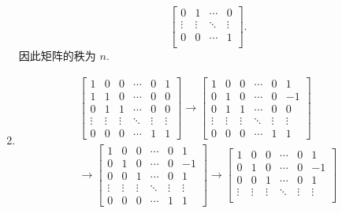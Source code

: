 \documentclass[a4paper, 11pt]{ctexart}
\begin{document}
\begin{enumerate}
\[\begin{bmatrix}
                0 & 1 & \cdots & 0 \\
                \vdots & \vdots & \ddots & \vdots \\
                0 & 0 & \cdots & 1 \\
            \end{bmatrix}.    
        \]
        因此矩阵的秩为 $n$.
    \item %
        \begin{gather*}
            \begin{bmatrix}
                1 & 0 & 0 & \cdots & 0 & 1 \\
                1 & 1 & 0 & \cdots & 0 & 0 \\
                0 & 1 & 1 & \cdots & 0 & 0 \\
                \vdots & \vdots & \vdots & \ddots & \vdots & \vdots \\
                0 & 0 & 0 & \cdots & 1 & 1   
            \end{bmatrix}
            \rightarrow
            \begin{bmatrix}
                1 & 0 & 0 & \cdots & 0 & 1 \\
                0 & 1 & 0 & \cdots & 0 & -1 \\
                0 & 1 & 1 & \cdots & 0 & 0 \\
                \vdots & \vdots & \vdots & \ddots & \vdots & \vdots \\
                0 & 0 & 0 & \cdots & 1 & 1   
            \end{bmatrix} \\
            \rightarrow
            \begin{bmatrix}
                1 & 0 & 0 & \cdots & 0 & 1 \\
                0 & 1 & 0 & \cdots & 0 & -1 \\
                0 & 0 & 1 & \cdots & 0 & 1 \\
                \vdots & \vdots & \vdots & \ddots & \vdots & \vdots \\
                0 & 0 & 0 & \cdots & 1 & 1   
            \end{bmatrix}
            \rightarrow
            \begin{bmatrix}
                1 & 0 & 0 & \cdots & 0 & 1 \\
                0 & 1 & 0 & \cdots & 0 & -1 \\
                0 & 0 & 1 & \cdots & 0 & 1 \\
                \vdots & \vdots & \vdots & \ddots & \vdots & \vdots \\

\end{bmatrix}
\end{gather*}
\end{enumerate}
\end{document}
